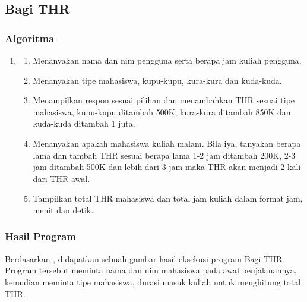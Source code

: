 \documentclass[../main.tex]{subfiles}
\begin{document}
    \subsection{Bagi THR}
    \subsubsection{Algoritma}
    \begin{enumerate}
        \item[]
        \begin{enumerate}
            \item{Menanyakan nama dan nim pengguna serta berapa jam kuliah pengguna.}
            \item{Menanyakan tipe mahasiswa, kupu-kupu, kura-kura dan kuda-kuda.}
            \item{Menampilkan respon sesuai pilihan dan menambahkan THR sesuai tipe mahasiswa, kupu-kupu ditambah 500K, kura-kura ditambah 850K dan kuda-kuda ditambah 1 juta.}
            \item{Menanyakan apakah mahasiswa kuliah malam. Bila iya, tanyakan berapa lama dan tambah THR sesuai berapa lama 1-2 jam ditambah 200K, 2-3 jam ditambah 500K dan lebih dari 3 jam maka THR akan menjadi 2 kali dari THR awal.}
            \item{Tampilkan total THR mahasiswa dan total jam kuliah dalam format jam, menit dan detik.}
        \end{enumerate}
    \end{enumerate}

    \subsubsection{{\Flowchart}}

    \subsubsection{{\Source} {\sCode}}

    \subsubsection{Hasil Program}
    \begin{indentpar}
        \hspace{\parindent}Berdasarkan , didapatkan sebuah gambar hasil eksekusi program Bagi THR. Program tersebut meminta nama dan nim mahasiswa pada awal penjalanannya, kemudian meminta tipe mahasiswa, durasi masuk kuliah untuk menghitung total THR.
    \end{indentpar}
    \newpage
\end{document}
